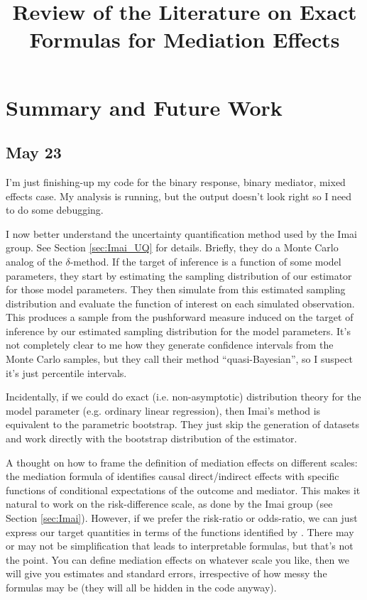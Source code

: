 \documentclass{article}
\title{Review of the Literature on Exact Formulas for Mediation Effects}
\begin{document}
\maketitle

\section{Summary and Future Work}

\subsection{May 23}

I'm just finishing-up my code for the binary response, binary mediator, mixed effects case. My analysis is running, but the output doesn't look right so I need to do some debugging. 

I now better understand the uncertainty quantification method used by the Imai group. See Section \ref{sec:Imai_UQ} for details. Briefly, they do a Monte Carlo analog of the $\delta$-method. If the target of inference is a function of some model parameters, they start by estimating the sampling distribution of our estimator for those model parameters. They then simulate from this estimated sampling distribution and evaluate the function of interest on each simulated observation. This produces a sample from the pushforward measure induced on the target of inference by our estimated sampling distribution for the model parameters. It's not completely clear to me how they generate confidence intervals from the Monte Carlo samples, but they call their method ``quasi-Bayesian'', so I suspect it's just percentile intervals. 

Incidentally, if we could do exact (i.e. non-asymptotic) distribution theory for the model parameter (e.g. ordinary linear regression), then Imai's method is equivalent to the parametric bootstrap. They just skip the generation of datasets and work directly with the bootstrap distribution of the estimator.

A thought on how to frame the definition of mediation effects on different scales: the mediation formula of \citet{Pea12} identifies causal direct/indirect effects with specific functions of conditional expectations of the outcome and mediator. This makes it natural to work on the risk-difference scale, as done by the Imai group (see Section \ref{sec:Imai}). However, if we prefer the risk-ratio or odds-ratio, we can just express our target quantities in terms of the functions identified by \citet{Pea12}. There may or may not be simplification that leads to interpretable formulas, but that's not the point. You can define mediation effects on whatever scale you like, then we will give you estimates and standard errors, irrespective of how messy the formulas may be (they will all be hidden in the code anyway).
\end{document}
